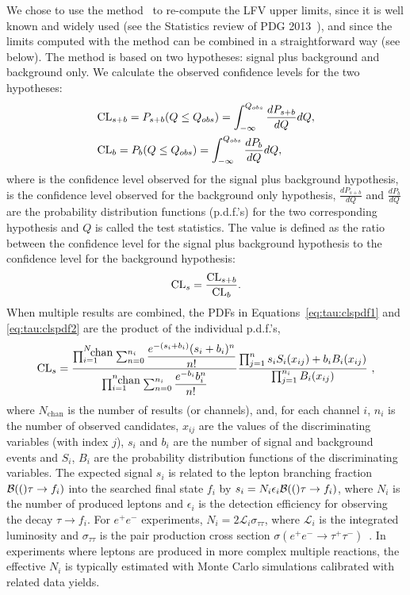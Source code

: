 We chose to use the \cls method~\cite{Mistlberger:2012rs} to re-compute the
\mtau LFV upper limits, since it is well known and widely used (see the
Statistics review of PDG 2013~\cite{PDG_2012}), and since the
limits computed with the \cls method can be combined in a straightforward
way (see below). The \cls method is based on two hypotheses: signal plus background and
background only. We calculate the observed confidence levels for the two
hypotheses:
\begin{align}
&\mbox{CL}_{s+b} = P_{s+b}(Q \leq Q_{obs}) = \int_{- \infty}^{Q_{obs}} \frac{dP_{s+b}}{dQ} dQ,
\label{eq:tau:clspdf1} \\
&\mbox{CL}_b = P_{b}(Q \leq Q_{obs}) = \int_{- \infty}^{Q_{obs}} \frac{dP_{b}}{dQ} dQ,
\label{eq:tau:clspdf2}
\end{align}
where \clsb is the confidence level observed for the signal plus background
hypothesis, \clb is the confidence level observed for the background only
hypothesis, $\frac{dP_{s+b}}{dQ}$ and $\frac{dP_{b}}{dQ}$ are the probability
distribution functions (p.d.f.'s) for the two corresponding hypothesis and
$Q$ is called the test statistics. The \cls value is defined as the ratio
between the confidence level for the signal plus background hypothesis to
the confidence level for the background hypothesis:
\begin{align}
\mbox{CL}_s = \dfrac{\mbox{CL}_{s+b}}{\mbox{CL}_b}.
\end{align}
When multiple results are combined, the PDFs in
Equations~\ref{eq:tau:clspdf1} and \ref{eq:tau:clspdf2} are the
product of the individual p.d.f.'s,
\begin{align}
\mbox{CL}_s = \dfrac{\prod_{i=1}^{N_{\mbox{chan}}}\sum_{n=0}^{n_i} \dfrac{e^{-(s_i+b_i)} (s_i+b_i)^{n}}{n!} }{\prod_{i=1}^{n_{\mbox{chan}}}  \sum_{n=0}^{n_i} \dfrac{e^{-b_i} b_i^{n}}{n!}}    \dfrac{\prod_{j=1}^{n} s_iS_i(x_{ij})+b_iB_i(x_{ij})}{\prod_{j=1}^{n_i}B_i(x_{ij})}~,
\end{align}
where $N_{\text{chan}}$ is the number of results (or channels), and, for each channel $i$,
$n_i$ is the number of observed candidates, $x_{ij}$ are the values of the
discriminating variables (with index $j$), $s_i$ and $b_i$ are the number
of signal and background events and $S_i$, $B_i$ are the probability
distribution functions of the discriminating variables.
The expected signal $s_i$ is related to the \mtau lepton branching
fraction ${\cal B}(()\tau \rightarrow f_i)$ into
the searched final state $f_i$ by $s_i = N_i\epsilon_i{\cal B}(()\tau \rightarrow
f_i)$, where $N_i$ is the number of produced \mtau leptons and
$\epsilon_i$ is the detection efficiency for observing the decay $\tau\to
f_i$. For $e^+ e^-$ experiments,
$N_i = 2\mathcal{L}_i\sigma_{\tau\tau}$, where $\mathcal{L}_i$ is the
integrated luminosity and $\sigma_{\tau\tau}$ is the
\mtau pair production cross section $\sigma(e^+ e^- \rightarrow \tau^+
\tau^-)$~\cite{Banerjee:2007is}.
In experiments where \mtau leptons are produced in more complex multiple
reactions, the effective $N_i$ is typically estimated with Monte Carlo simulations
calibrated with related data yields.

